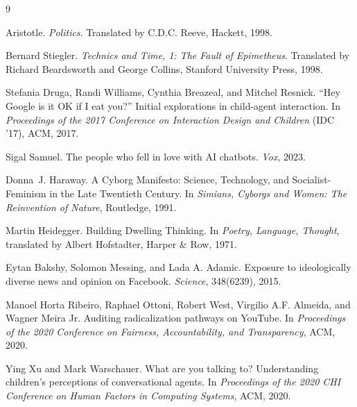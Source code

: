 
\begin{thebibliography}{9}

Aristotle.
\newblock \emph{Politics}.
\newblock Translated by C.D.C. Reeve, Hackett, 1998.

Bernard Stiegler.
\newblock \emph{Technics and Time, 1: The Fault of Epimetheus}.
\newblock Translated by Richard Beardsworth and George Collins, Stanford University Press, 1998.

Stefania Druga, Randi Williams, Cynthia Breazeal, and Mitchel Resnick.
\newblock ``Hey Google is it OK if I eat you?'' Initial explorations in child-agent interaction.
\newblock In \emph{Proceedings of the 2017 Conference on Interaction Design and Children} (IDC '17), ACM, 2017.

Sigal Samuel.
\newblock The people who fell in love with AI chatbots.
\newblock \emph{Vox}, 2023.

Donna~J. Haraway.
\newblock A Cyborg Manifesto: Science, Technology, and Socialist-Feminism in the Late Twentieth Century.
\newblock In \emph{Simians, Cyborgs and Women: The Reinvention of Nature}, Routledge, 1991.

Martin Heidegger.
\newblock Building Dwelling Thinking.
\newblock In \emph{Poetry, Language, Thought}, translated by Albert Hofstadter, Harper \& Row, 1971.

Eytan Bakshy, Solomon Messing, and Lada A. Adamic.
\newblock Exposure to ideologically diverse news and opinion on Facebook.
\newblock \emph{Science}, 348(6239), 2015.

Manoel Horta Ribeiro, Raphael Ottoni, Robert West, Virgilio A.F. Almeida, and Wagner Meira Jr.
\newblock Auditing radicalization pathways on YouTube.
\newblock In \emph{Proceedings of the 2020 Conference on Fairness, Accountability, and Transparency}, ACM, 2020.

Ying Xu and Mark Warschauer.
\newblock What are you talking to? Understanding children's perceptions of conversational agents.
\newblock In \emph{Proceedings of the 2020 CHI Conference on Human Factors in Computing Systems}, ACM, 2020.

\end{thebibliography}
